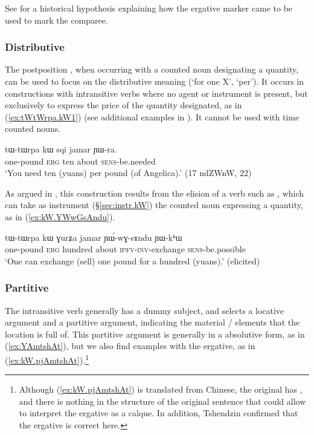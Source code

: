 See \citet{jacques16comparative} for a historical hypothesis explaining how the ergative marker came to be used to mark the comparee. 

\subsubsection{Distributive} \label{sec:distributive.kW}
The postposition , when occurring with a counted noun designating a quantity, can be used to focus on the distributive meaning (`for one X', `per'). It occurs in constructions with intransitive verbs where no agent or instrument is present, but exclusively to express the price of the quantity designated, as in  (\ref{ex:tWtWrpa.kW1}) (see additional examples in \citealt[5--6]{jacques16comparative}). It cannot be used with time counted nouns.

 \begin{exe} 
\ex \label{ex:tWtWrpa.kW1}
\gll  tɯ-tɯrpa kɯ sqi jamar ɲɯ-ra. \\
one-pound \textsc{erg} ten about \textsc{sens}-be.needed \\
\glt `You need ten (yuans) per pound (of Angelica).' (17 ndZWnW, 22)
\end{exe}  

As argued in \citet[23]{jacques16comparative}, this construction results from the elision of a verb such as , which can take as instrument (§\ref{sec:instr.kW}) the counted noun expressing a quantity, as in (\ref{ex:kW.YWwGsAndu}).


\begin{exe}
\ex \label{ex:kW.YWwGsAndu}
\gll tɯ-tɯrpa kɯ ɣurʑa jamar ɲɯ́-wɣ-sɤndu ɲɯ-kʰɯ \\
one-pound \textsc{erg} hundred about \textsc{ipfv}-\textsc{inv}-exchange \textsc{sens}-be.possible \\
\glt `One can exchange (sell) one pound for a hundred (yuans).' (elicited)
\end{exe}

\subsubsection{Partitive} \label{sec:kW.mtshAt}
The intransitive verb  generally has a dummy subject, and selects a locative argument and a partitive argument, indicating the material / elements that the location is full of. This partitive argument is generally in a absolutive form, as in (\ref{ex:YAmtshAt}), but we also find examples with the ergative, as in (\ref{ex:kW.pjAmtshAt}).\footnote{Although (\ref{ex:kW.pjAmtshAt}) is translated from Chinese, the original has , and there is nothing in the structure of the original sentence that could allow to interpret the ergative as a calque. In addition, Tshendzin confirmed that the ergative is correct here. }

